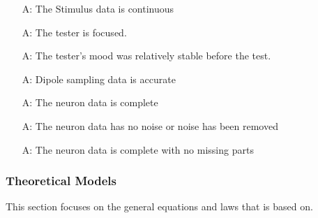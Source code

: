 \documentclass[12pt]{article}
\newcounter{assumpnum} %
\begin{document}
\begin{itemize}

  \item[A\refstepcounter{assumpnum}\theassumpnum:] The Stimulus data is continuous
  \item[A\refstepcounter{assumpnum}\theassumpnum:] The tester is focused.
  \item[A\refstepcounter{assumpnum}\theassumpnum:] The tester's mood was relatively stable before the test.
  \item[A\refstepcounter{assumpnum}\theassumpnum:] Dipole sampling data is accurate
  \item[A\refstepcounter{assumpnum}\theassumpnum:] The neuron data is complete
  \item[A\refstepcounter{assumpnum}\theassumpnum:] The neuron data has no noise or noise has been removed
  \item[A\refstepcounter{assumpnum}\theassumpnum:] The neuron data is complete with no missing parts

\end{itemize}

\subsubsection{Theoretical Models}\label{sec_theoretical}

%

This section focuses on the general equations and laws that \progname{} is based
on.
\end{document}
